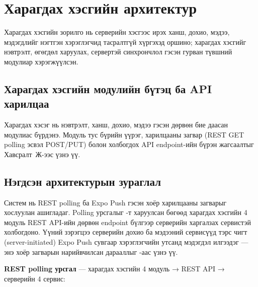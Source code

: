 \section{Харагдах хэсгийн архитектур}
\label{sec:modular_api_blueprint}

Харагдах хэсгийн зорилго нь серверийн хэсгээс ирэх ханш, дохио, мэдээ, мэдэгдлийг нэгтгэн хэрэглэгчид тасралтгүй хүргэхэд оршино; харагдах хэсгийг нэвтрэлт, өгөгдөл харуулах, сервертэй синхрончлол гэсэн гурван түвшний модулиар хэрэгжүүлсэн.

\subsection{Харагдах хэсгийн модулийн бүтэц ба API харилцаа}

Харагдах хэсэг нь нэвтрэлт, ханш, дохио, мэдээ гэсэн дөрвөн бие даасан модулиас бүрдэнэ. Модуль тус бүрийн үүрэг, харилцааны загвар (REST GET polling эсвэл POST/PUT) болон холбогдох API endpoint-ийн бүрэн жагсаалтыг Хавсралт~Ж-ээс үзнэ үү.

\subsection{Нэгдсэн архитектурын зураглал}

Систем нь REST polling ба Expo Push гэсэн хоёр харилцааны загварыг хослуулан ашигладаг. Polling урсгалыг -т харуулсан бөгөөд харагдах хэсгийн 4 модуль REST API-ийн дөрвөн endpoint бүлгээр серверийн харгалзах сервистэй холбогдоно. Үүний зэрэгцээ серверийн дохио ба мэдээний сервисүүд тэрс чигт (server-initiated) Expo Push сувгаар хэрэглэгчийн утсанд мэдэгдэл илгээдэг — энэ хоёр загварын нарийвчилсан дарааллыг -аас үзнэ үү.

\noindent\textbf{REST polling урсгал} — харагдах хэсгийн 4 модуль → REST API → серверийн 4 сервис:


